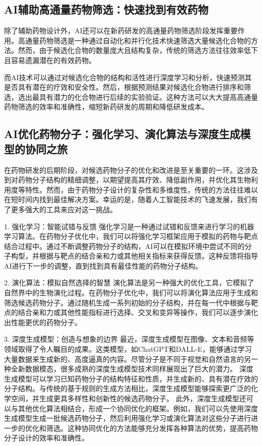 \subsection{AI辅助高通量药物筛选：快速找到有效药物}
除了辅助药物设计外，AI还可以在新药研发的高通量药物筛选阶段发挥重要作用。高通量药物筛选是一种通过自动化和并行化技术快速筛选大量候选化合物的方法。然而，由于候选化合物的数量庞大且结构复杂，传统的筛选方法往往效率低下且容易遗漏潜在的有效药物。

而AI技术可以通过对候选化合物的结构和活性进行深度学习和分析，快速预测其是否具有潜在的疗效和安全性。然后，根据预测结果对候选化合物进行排序和筛选，选出最具有潜力的化合物进行后续的实验验证。这种方法可以大大提高高通量药物筛选的效率和准确性，缩短新药研发的周期和降低研发成本。

\subsection{AI优化药物分子：强化学习、演化算法与深度生成模型的协同之旅}
在药物研发的后期阶段，对候选药物分子的优化和改进是至关重要的一环。这涉及到对药物分子结构的精细调整，以期望提高其疗效、降低副作用，并优化其生物利用度等特性。然而，由于药物分子设计的复杂性和多维度性，传统的方法往往难以在短时间内找到最佳解决方案。幸运的是，随着人工智能技术的飞速发展，我们有了更多强大的工具来应对这一挑战。

1. 强化学习：智能试错与反馈
强化学习是一种通过试错和反馈来进行学习的机器学习算法。在药物分子优化中，我们可以将强化学习框架应用于模拟的药物与靶点结合过程中。通过不断调整药物分子的结构，AI可以在模拟环境中尝试不同的分子构型，并根据与靶点的结合亲和力或其他相关指标来获得反馈。这种反馈将指导AI进行下一步的调整，直到找到具有最佳性能的药物分子结构。

2. 演化算法：模拟自然选择的智慧
演化算法是另一种强大的优化工具，它模拟了自然界中的生物演化过程。在药物分子优化中，我们可以将演化算法应用于生成和筛选候选药物分子。通过随机生成一系列初始的分子结构，并在每一代中根据与靶点的结合亲和力或其他性能指标进行选择、交叉和变异等操作，我们可以逐步演化出性能更优的药物分子。

3. 深度生成模型：创造与想象的边界
最近，深度生成模型在图像、文本和音频等领域取得了令人瞩目的成果。这类模型，如ChatGPT和DALL-E，能够通过学习大量数据来生成新的、高度逼真的内容。尽管分子是不同于视觉和自然语言的另一种全新数据模态，很多成熟的深度生成模型技术同样展现出了巨大的潜力。
深度生成模型可以学习已知药物分子的结构特征和性质，并生成新的、具有潜在疗效的分子结构。与传统的基于规则的生成方法相比，深度生成模型能够探索更广泛的化学空间，并生成更具多样性和创新性的候选药物分子。
此外，深度生成模型还可以与其他优化算法相结合，形成一个协同优化的框架。例如，我们可以先使用深度生成模型生成一批候选药物分子，然后利用强化学习或演化算法对这些分子进行进一步的优化和筛选。这种协同优化的方法能够充分发挥各种算法的优势，提高药物分子设计的效率和准确性。

